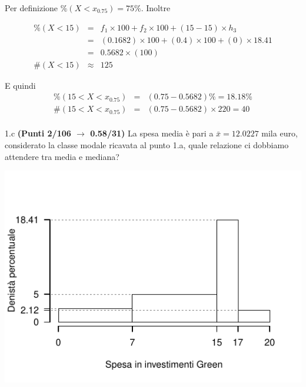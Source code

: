 \documentclass[
  11pt,
]{book}
\theoremstyle{mytheoremstyle}
\theoremstyle{mydefstyle}
\newenvironment{sol}
  {
  \begin{tcolorbox}[enhanced,breakable,arc=0.1mm,boxrule=1pt,colback=white,colframe=iblue,
  title=\bf \fontfamily{lmss}\selectfont \hspace{.5 cm} Soluzione,drop fuzzy shadow]

}{
\end{tcolorbox}
  }
\begin{document}
\begin{sol}
Per definizione \(\%(X<x_{ 0.75 })= 75 \%\). Inoltre

\begin{eqnarray*}
   \%(X< 15 ) &=&  f_{ 1 }\times 100+f_{ 2 }\times 100 +( 15 - 15 )\times h_{ 3 } \\
                &=&  ( 0.1682 )\times 100+( 0.4 )\times 100 +( 0 )\times  18.41  \\
                &=&  0.5682 \times(100) \\
\#(X< 15 )    &\approx& 125 
\end{eqnarray*}

E quindi
\begin{eqnarray*}
   \%( 15 < X < x_{0.75} ) &=& ( 0.75 - 0.5682 )\%= 18.18 \% \\
   \#( 15 < X < x_{0.75} ) &=& ( 0.75 - 0.5682 )\times  220 = 40  \\
\end{eqnarray*}

\end{sol}

1.c \textbf{(Punti 2/106 \(\rightarrow\) 0.58/31)} La spesa media è pari a \(\bar x=12.0227\) mila euro,
considerato la classe modale ricavata al punto 1.a, quale relazione ci dobbiamo attendere tra media e mediana?

\begin{sol}

\begin{center}\includegraphics{Esami_passati_con_soluzioni_files/figure-latex/2022-42-1} \end{center}

\end{sol}
\end{document}
